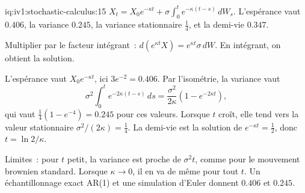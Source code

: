 \begin{solution}{iq:iv1:stochastic-calculus:15}
$X_t = X_0e^{-\kappa t} + \sigma\int_0^te^{-\kappa(t - s)}\,dW_s$. L'espérance vaut $0.406$, la variance $0.245$, la variance stationnaire $\frac14$, et la demi-vie $0.347$.

Multiplier par le facteur intégrant~: $d(e^{\kappa t}X) = e^{\kappa t}\sigma\,dW$. En intégrant, on obtient la solution.

L'espérance vaut $X_0e^{-\kappa t}$, ici $3e^{-2} = 0.406$. Par l'isométrie, la variance vaut
\[
\sigma^2\int_0^te^{-2\kappa(t - s)}\,ds = \frac{\sigma^2}{2\kappa}\left(1 - e^{-2\kappa t}\right),
\]
qui vaut $\frac14(1 - e^{-4}) = 0.245$ pour ces valeurs. Lorsque $t$ croît, elle tend vers la valeur stationnaire $\sigma^2/(2\kappa) = \frac14$. La demi-vie est la solution de $e^{-\kappa t} = \frac12$, donc $t = \ln 2/\kappa$.

Limites~: pour $t$ petit, la variance est proche de $\sigma^2t$, comme pour le mouvement brownien standard. Lorsque $\kappa \to 0$, il en va de même pour tout $t$. Un échantillonnage exact AR(1) et une simulation d'Euler donnent $0.406$ et $0.245$.



\end{solution}

